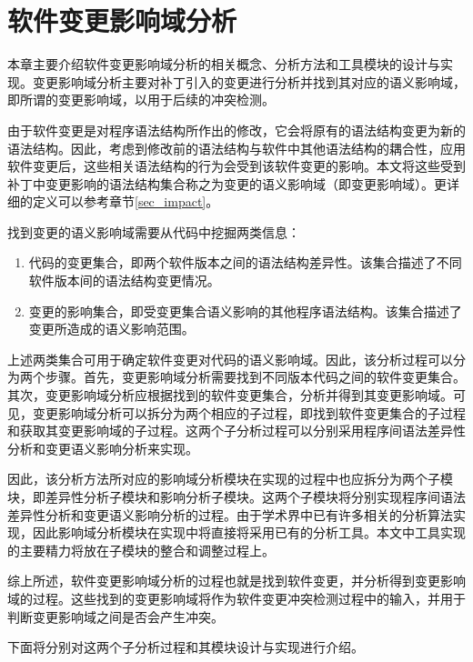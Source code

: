 \chapter{软件变更影响域分析}
\label{chap_impact}

本章主要介绍软件变更影响域分析的相关概念、分析方法和工具模块的设计与实现。变更影响域分析主要对补丁引入的变更进行分析并找到其对应的语义影响域，即所谓的变更影响域，以用于后续的冲突检测。

由于软件变更是对程序语法结构所作出的修改，它会将原有的语法结构变更为新的语法结构。因此，考虑到修改前的语法结构与软件中其他语法结构的耦合性，应用软件变更后，这些相关语法结构的行为会受到该软件变更的影响。本文将这些受到补丁中变更影响的语法结构集合称之为变更的语义影响域（即变更影响域）。更详细的定义可以参考章节\ref {sec_impact}。

找到变更的语义影响域需要从代码中挖掘两类信息：
\begin{enumerate}
	\item 代码的变更集合，即两个软件版本之间的语法结构差异性。该集合描述了不同软件版本间的语法结构变更情况。
	\item 变更的影响集合，即受变更集合语义影响的其他程序语法结构。该集合描述了变更所造成的语义影响范围。
\end{enumerate}

上述两类集合可用于确定软件变更对代码的语义影响域。因此，该分析过程可以分为两个步骤。首先，变更影响域分析需要找到不同版本代码之间的软件变更集合。其次，变更影响域分析应根据找到的软件变更集合，分析并得到其变更影响域。可见，变更影响域分析可以拆分为两个相应的子过程，即找到软件变更集合的子过程和获取其变更影响域的子过程。这两个子分析过程可以分别采用程序间语法差异性分析和变更语义影响分析来实现。

因此，该分析方法所对应的影响域分析模块在实现的过程中也应拆分为两个子模块，即差异性分析子模块和影响分析子模块。这两个子模块将分别实现程序间语法差异性分析和变更语义影响分析的过程。由于学术界中已有许多相关的分析算法实现，因此影响域分析模块在实现中将直接将采用已有的分析工具。本文中工具实现的主要精力将放在子模块的整合和调整过程上。

综上所述，软件变更影响域分析的过程也就是找到软件变更，并分析得到变更影响域的过程。这些找到的变更影响域将作为软件变更冲突检测过程中的输入，并用于判断变更影响域之间是否会产生冲突。

下面将分别对这两个子分析过程和其模块设计与实现进行介绍。


